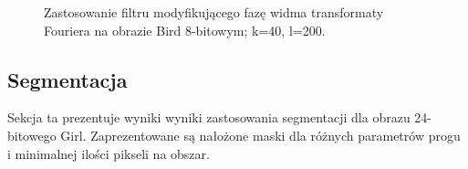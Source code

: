 \documentclass{classrep}
\begin{document}
\begin{figure}[H]
    \qquad
    \qquad
    \qquad
    \caption{Zastosowanie filtru modyfikującego fazę widma transformaty Fouriera na obrazie Bird 8-bitowym; k=40, l=200.}%
\end{figure} 

\subsection{Segmentacja}
Sekcja ta prezentuje wyniki wyniki zastosowania segmentacji dla obrazu 24-bitowego Girl. Zaprezentowane są nałożone maski dla różnych parametrów progu i minimalnej ilości pikseli na obszar.
\end{document}
